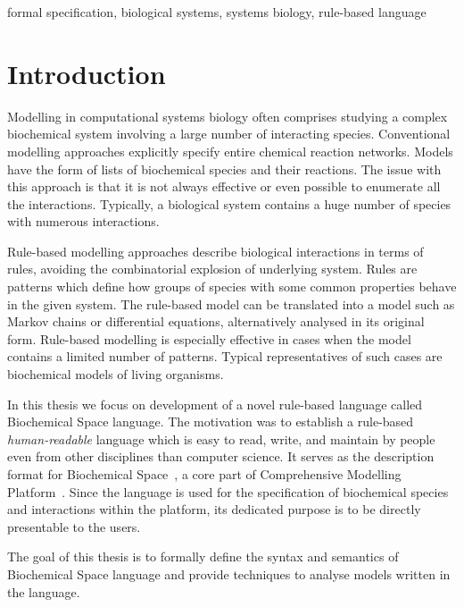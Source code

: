 \documentclass[12pt, twoside]{fithesis2} %
\begin{document}
\begin{ThesisKeyWords}
formal specification, biological systems, systems biology, rule-based language
\end{ThesisKeyWords}

\MainMatter
\tableofcontents

\chapter{Introduction}

Modelling in computational systems biology often comprises studying a complex biochemical system involving a large number of interacting species. Conventional modelling approaches explicitly specify entire chemical reaction networks. Models have the form of lists of biochemical species and their reactions. The issue with this approach is that it is not always effective or even possible to enumerate all the interactions. Typically, a biological system contains a huge number of species with numerous interactions.

Rule-based modelling approaches describe biological interactions in terms of rules, avoiding the combinatorial explosion of underlying system. Rules are patterns which define how groups of species with some common properties behave in the given system. The rule-based model can be translated into a model such as Markov chains or differential equations, alternatively analysed in its original form. Rule-based modelling is especially effective in cases when the model contains a limited number of patterns. Typical representatives of such cases are biochemical models of living organisms.

In this thesis we focus on development of a novel rule-based language called Biochemical Space language. The motivation was to establish a rule-based \emph{human-readable} language which is easy to read, write, and maintain by people even from other disciplines than computer science. It serves as the description format for Biochemical Space~\cite{BCS}, a core part of Comprehensive Modelling Platform~\cite{cs2bio2013}. Since the language is used for the specification of biochemical species and interactions within the platform, its dedicated purpose is to be directly presentable to the users.

The goal of this thesis is to formally define the syntax and semantics of Biochemical Space language and provide techniques to analyse models written in the language. 
\end{document}
